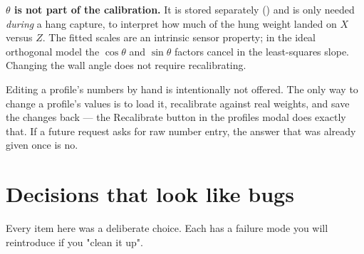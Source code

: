 \documentclass[11pt,a4paper]{article}
\begin{document}
\begin{infobox}
\textbf{$\theta$ is not part of the calibration.} It is stored separately
() and is only needed \emph{during} a
hang capture, to interpret how much of the hung weight landed on $X$ versus $Z$.
The fitted scales are an intrinsic sensor property; in the ideal orthogonal
model the $\cos\theta$ and $\sin\theta$ factors cancel in the least-squares
slope. Changing the wall angle does not require recalibrating.
\end{infobox}

Editing a profile's numbers by hand is intentionally not offered. The only way
to change a profile's values is to load it, recalibrate against real weights,
and save the changes back --- the \textsf{Recalibrate} button in the profiles
modal does exactly that. If a future request asks for raw number entry, the
answer that was already given once is no.

\section{Decisions that look like bugs}

Every item here was a deliberate choice. Each has a failure mode you will
reintroduce if you "clean it up".
\end{document}
